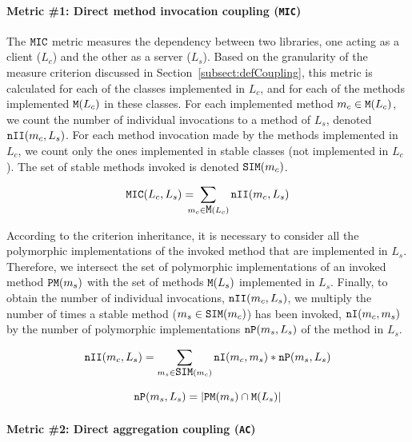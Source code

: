 \paragraph{Metric \#1: Direct method invocation coupling (\texttt{MIC})}
The $\verb|MIC|$ metric measures the dependency between two libraries, one acting as a client ($L_c$) and the other as a server ($L_s$).
Based on the granularity of the measure criterion discussed in Section~\ref{subsect:defCoupling}, this metric is calculated for each of the classes implemented in $L_c$, and for each of the methods implemented $\verb|M|(L_c)$ in these classes. For each implemented method  $m_c \in \verb|M|(L_c)$, we count the number of individual invocations to a method of $L_s$, denoted $\verb|nII|(m_c,L_s)$. For each method invocation made by the methods implemented in $L_c$, we count only the ones implemented in stable classes (not implemented in $L_c$). The set of stable methods invoked is denoted $\verb|SIM|(m_c)$.

\begin{equation}
\label{eqn:mic}
\verb|MIC|(L_c, L_s) =\!\!\!\!\! \sum_{m_c \in \verb|M|(L_c)} \verb|nII|(m_c, L_s)
\end{equation}

According to the criterion inheritance, it is necessary to consider all the polymorphic implementations of the invoked method that are implemented in $L_s$. Therefore, we intersect the set of polymorphic implementations of an invoked method $\verb|PM|(m_s)$ with the set of methods $\verb|M|(L_s)$ implemented in $L_s$. Finally, to obtain the number of individual invocations, $\verb|nII|(m_c,L_s)$, we multiply the number of times a stable method ($m_s \in \verb|SIM|(m_c)$) has been invoked, $\verb|nI|(m_c, m_s)$ by the number of polymorphic implementations $\verb|nP|(m_s, L_s)$ of the method in $L_s$.

\begin{equation}
\label{eqn:mic-nii}
   \verb|nII|(m_c, L_s) = \sum_{m_s \in \verb|SIM|(m_c)} \verb|nI|(m_c, m_s)*\verb|nP|(m_s, L_s)
\end{equation}

\begin{equation}
\label{eqn:mic-np}
    \verb|nP|(m_s, L_s) = |\verb|PM|(m_s) \cap \verb|M|(L_s)|
\end{equation}

\paragraph{Metric \#2: Direct aggregation coupling (\texttt{AC})}

